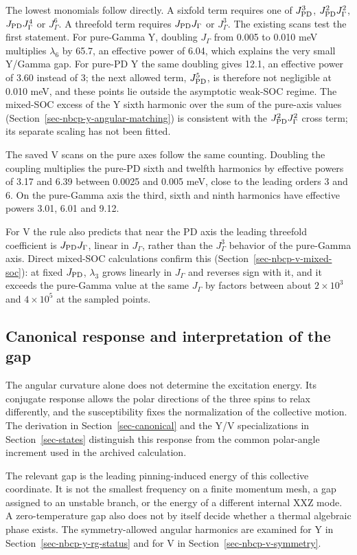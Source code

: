 The lowest monomials follow directly. A sixfold term requires one of
\(J_{\rm PD}^3\), \(J_{\rm PD}^2J_\Gamma^2\), \(J_{\rm PD}J_\Gamma^4\) or
\(J_\Gamma^6\). A threefold term requires \(J_{\rm PD}J_\Gamma\) or
\(J_\Gamma^3\). The existing scans test the first statement. For
pure-Gamma Y, doubling \(J_\Gamma\) from 0.005 to 0.010 meV multiplies
\(\lambda_6\) by 65.7, an effective power of 6.04, which explains the
very small Y/Gamma gap. For pure-PD Y the same doubling gives 12.1, an
effective power of 3.60 instead of 3; the next allowed term,
\(J_{\rm PD}^5\), is therefore not negligible at 0.010 meV, and these
points lie outside the asymptotic weak-SOC regime. The mixed-SOC excess
of the Y sixth harmonic over the sum of the pure-axis values
(Section~\ref{sec-nbcp-y-angular-matching}) is consistent with the
\(J_{\rm PD}^2J_\Gamma^2\) cross term; its separate scaling has not been
fitted.

The saved V scans on the pure axes follow the same counting. Doubling
the coupling multiplies the pure-PD sixth and twelfth harmonics by
effective powers of 3.17 and 6.39 between 0.0025 and 0.005 meV, close to
the leading orders 3 and 6. On the pure-Gamma axis the third, sixth and
ninth harmonics have effective powers 3.01, 6.01 and 9.12.

For V the rule also predicts that near the PD axis the leading threefold
coefficient is \(J_{\rm PD}J_\Gamma\), linear in \(J_\Gamma\), rather than
the \(J_\Gamma^3\) behavior of the pure-Gamma axis. Direct mixed-SOC
calculations confirm this (Section~\ref{sec-nbcp-v-mixed-soc}): at fixed
\(J_{\rm PD}\), \(\lambda_3\) grows linearly in \(J_\Gamma\) and reverses
sign with it, and it exceeds the pure-Gamma value at the same
\(J_\Gamma\) by factors between about \(2\times10^3\) and \(4\times10^5\)
at the sampled points.

\subsection{Canonical response and interpretation of the
gap}\label{canonical-response-and-interpretation-of-the-gap}

The angular curvature alone does not determine the excitation energy.
Its conjugate response allows the polar directions of the three spins to
relax differently, and the susceptibility fixes the normalization of the
collective motion. The derivation in Section~\ref{sec-canonical} and the
Y/V specializations in Section~\ref{sec-states} distinguish this
response from the common polar-angle increment used in the archived
calculation.

The relevant gap is the leading pinning-induced energy of this
collective coordinate. It is not the smallest frequency on a finite
momentum mesh, a gap assigned to an unstable branch, or the energy of a
different internal XXZ mode. A zero-temperature gap also does not by
itself decide whether a thermal algebraic phase exists. The
symmetry-allowed angular harmonics are examined for Y in
Section~\ref{sec-nbcp-y-rg-status} and for V in
Section~\ref{sec-nbcp-v-symmetry}.
